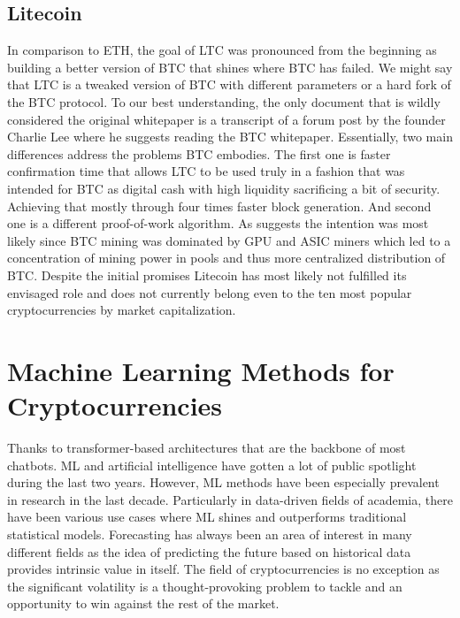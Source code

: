 \subsection{Litecoin}
In comparison to \ac{ETH}, the goal of \ac{LTC} was pronounced from the 
beginning as building a better version of \ac{BTC} that shines where
\ac{BTC} has failed. We might say that \ac{LTC} is a tweaked version of \ac{BTC} with 
different parameters or a hard fork of the \ac{BTC} protocol. 
To our best understanding, the only document that 
is wildly considered the original whitepaper is a transcript of a forum
post by the founder Charlie Lee where he suggests reading 
the \ac{BTC} whitepaper.
Essentially, two main differences address the problems
\ac{BTC} embodies. The first one is faster confirmation time that allows 
\ac{LTC} to be used truly in a fashion that was intended for \ac{BTC} as 
digital cash with high liquidity sacrificing a bit of security. Achieving
that mostly through four times faster block generation. And second one 
is a different proof-of-work algorithm. As \cite{Padmavathi2018} suggests
the intention was most likely since \ac{BTC} mining
was dominated by GPU and ASIC miners which led to a concentration of mining power
in pools and thus more centralized distribution of \ac{BTC}. Despite the initial
promises Litecoin has most likely not fulfilled its envisaged role
and does not currently belong even to the ten most popular cryptocurrencies
by market capitalization.


\section{Machine Learning Methods for Cryptocurrencies}
\label{sec:ml}
Thanks to transformer-based architectures that are the backbone 
of most chatbots. \ac{ML} and artificial intelligence have gotten a lot
of public spotlight during the last two years. However, \ac{ML} methods
have been especially prevalent in research in the last decade.
Particularly in data-driven fields of academia, there have been various
use cases where \ac{ML} shines and outperforms traditional statistical models.
Forecasting has always been an area of interest in many different fields
as the idea of predicting the future based on historical data 
provides intrinsic value in itself.
The field of cryptocurrencies is no exception as the significant volatility
is a thought-provoking problem to tackle and an opportunity to 
win against the rest of the market.


